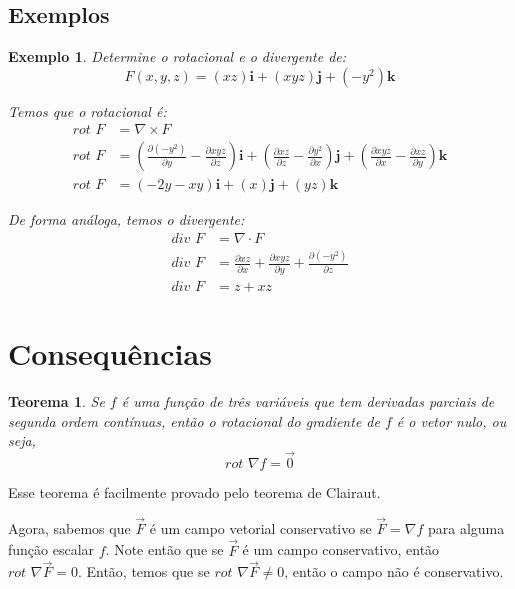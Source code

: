 \documentclass{article}
\newcommand{\PartialDer}[2] {\frac{\partial #1}{\partial #2}}
\newcommand{\FVett}[3] {\left(#1\right) \textbf{i} + \left(#2\right) \textbf{j} + \left(#3\right) \textbf {k}}
\newcommand{\Rot}[0] {\textit{rot }}
\newcommand{\Div}[0] {\textit{div }}
\newtheorem{theorem}{Teorema}[section]
\newtheorem{example}{Exemplo}[section]
\begin{document}
        \subsection{Exemplos}
            \begin{example}
                Determine o rotacional e o divergente de:
                \[
                    F(x,y,z) = \FVett{xz}{xyz}{-y^2}
                \]

                Temos que o rotacional é:
                \begin{align*}
                    \Rot F &= \nabla \times F\\
                    \Rot F &= \FVett{\PartialDer{(-y^2)}{y} - \PartialDer{xyz}{z}}{\PartialDer{xz}{z} - \PartialDer{y^2}{x}}{\PartialDer{xyz}{x} - \PartialDer{xz}{y}}\\
                    \Rot F &= \FVett{-2y-xy}{x}{yz}
                \end{align*}

                De forma análoga, temos o divergente:
                \begin{align*}
                    \Div F &= \nabla \cdot F\\
                    \Div F &= \PartialDer{xz}{x} + \PartialDer{xyz}{y} + \PartialDer{(-y^2)}{z}\\
                    \Div F &= z + xz
                \end{align*}
            \end{example}

    \section{Consequências}
        \begin{theorem}
            \label{th:rot0}
            Se $f$ é uma função de três variáveis que tem derivadas parciais de segunda ordem contínuas, então
            o rotacional do gradiente de $f$ é o vetor nulo, ou seja,
            \[
                \Rot \nabla f = \vec{0}
            \]
        \end{theorem}

        Esse teorema é facilmente provado pelo teorema de Clairaut.

        Agora, sabemos que $\vec{F}$ é um campo vetorial conservativo se $\vec{F} = \nabla f$ para alguma
        função escalar $f$. Note então que se $\vec{F}$ é um campo conservativo, então $\Rot \nabla \vec{F} = 0$.
        Então, temos que se $\Rot \nabla \vec{F} \neq 0$, então o campo não é conservativo.
\end{document}
